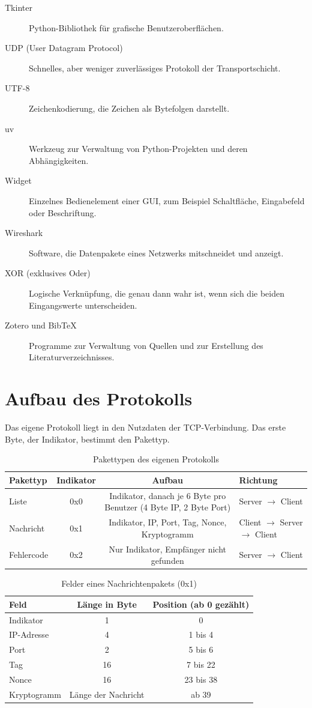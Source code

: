 \begin{description}
\item[Tkinter] Python-Bibliothek für grafische Benutzeroberflächen.
\item[UDP (User Datagram Protocol)] Schnelles, aber weniger zuverlässiges Protokoll der Transportschicht.
\item[UTF-8] Zeichenkodierung, die Zeichen als Bytefolgen darstellt.
\item[uv] Werkzeug zur Verwaltung von Python-Projekten und deren Abhängigkeiten.
\item[Widget] Einzelnes Bedienelement einer GUI, zum Beispiel Schaltfläche, Eingabefeld oder Beschriftung.
\item[Wireshark] Software, die Datenpakete eines Netzwerks mitschneidet und anzeigt.
\item[XOR (exklusives Oder)] Logische Verknüpfung, die genau dann wahr ist, wenn sich die beiden Eingangswerte unterscheiden.
\item[Zotero und BibTeX] Programme zur Verwaltung von Quellen und zur Erstellung des Literaturverzeichnisses.
\end{description}

\section{Aufbau des Protokolls}
Das eigene Protokoll liegt in den Nutzdaten der TCP-Verbindung. Das erste Byte, der Indikator, bestimmt den Pakettyp.
\begin{table}[H]
    \centering
    \begin{tabular}{|l|c|c|l|}\hline
         Pakettyp & Indikator & Aufbau & Richtung\\\hline
         Liste & 0x0 & Indikator, danach je 6 Byte pro Benutzer (4 Byte IP, 2 Byte Port) & Server $\rightarrow$ Client\\\hline
         Nachricht & 0x1 & Indikator, IP, Port, Tag, Nonce, Kryptogramm & Client $\rightarrow$ Server $\rightarrow$ Client\\\hline
         Fehlercode & 0x2 & Nur Indikator, Empfänger nicht gefunden & Server $\rightarrow$ Client\\\hline
    \end{tabular}
    \caption{Pakettypen des eigenen Protokolls}
    \label{tab:A1}
\end{table}
\begin{table}[H]
    \centering
    \begin{tabular}{|l|c|c|}\hline
         Feld & Länge in Byte & Position (ab 0 gezählt)\\\hline
         Indikator & 1 & 0\\\hline
         IP-Adresse & 4 & 1 bis 4\\\hline
         Port & 2 & 5 bis 6\\\hline
         Tag & 16 & 7 bis 22\\\hline
         Nonce & 16 & 23 bis 38\\\hline
         Kryptogramm & Länge der Nachricht & ab 39\\\hline
    \end{tabular}
    \caption{Felder eines Nachrichtenpakets (0x1)}
    \label{tab:A2}
\end{table}

